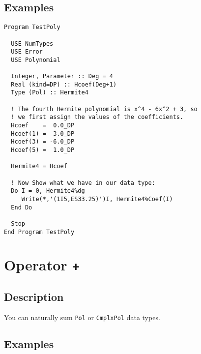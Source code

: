\subsection{Examples}


\begin{lstlisting}[emph=Type,
                   emphstyle=\color{blue},
                   frame=trBL,
                   caption=Assigning polynomials.,
                   label=assignpol]
Program TestPoly

  USE NumTypes
  USE Error
  USE Polynomial

  Integer, Parameter :: Deg = 4
  Real (kind=DP) :: Hcoef(Deg+1)
  Type (Pol) :: Hermite4

  ! The fourth Hermite polynomial is x^4 - 6x^2 + 3, so
  ! we first assign the values of the coefficients.
  Hcoef    =  0.0_DP
  Hcoef(1) =  3.0_DP
  Hcoef(3) = -6.0_DP
  Hcoef(5) =  1.0_DP

  Hermite4 = Hcoef

  ! Now Show what we have in our data type:
  Do I = 0, Hermite4%dg
     Write(*,'(1I5,ES33.25)')I, Hermite4%Coef(I)
  End Do

  Stop
End Program TestPoly
\end{lstlisting}

\section{Operator \texttt{+}}

\subsection{Description}

You can naturally sum \texttt{Pol} or \texttt{CmplxPol} data types.

\subsection{Examples}

